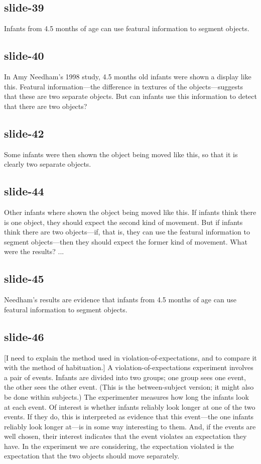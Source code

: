\documentclass[12pt,\papersize]{extarticle}
\begin{document}
\subsection{slide-39}
Infants from 4.5 months of age can use featural information to segment objects.
 
\subsection{slide-40}
In Amy Needham's 1998 study, 4.5 months old infants were shown a display like this.
Featural information---the difference in textures of the objects---suggests that these are two 
separate objects.  But can infants use this information to detect that there are two objects?
 
\subsection{slide-42}
Some infants were then shown the object being moved like this, so that it is clearly two 
separate objects.
 
\subsection{slide-44}
Other infants where shown the object being moved like this.
If infants think there is one object, they should expect the second kind of movement.
But if infants think there are two objects---if, that is, they can use the featural 
information to segment objects---then they should expect the former kind of movement.
What were the results?  ...
 
\subsection{slide-45}
Needham's results are evidence that infants from 4.5 months of age can use featural information 
to segment objects.
 
\subsection{slide-46}
[I need to explain the method used in violation-of-expectations, and to compare it with
the method of habituation.]
A violation-of-expectations experiment involves a pair of events.
Infants are divided into two groups; one group sees one event, the other sees the other event.
(This is the between-subject version; it might also be done within subjects.)
The experimenter measures how long the infants look at each event.
Of interest is whether infants reliably look longer at one of the two events.
If they do, this is interpreted as evidence that this event---the one infants reliably look 
longer at---is in some way interesting to them. 
And, if the events are well chosen, their interest indicates that the event violates an
expectation they have.
In the experiment we are considering, the expectation violated is the expectation that 
the two objects should move separately.
 
\end{document}
